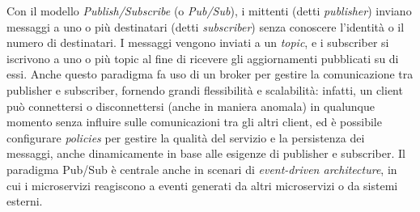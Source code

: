 Con il modello \emph{Publish/Subscribe} (o \emph{Pub/Sub}), i mittenti (detti \emph{publisher}) inviano messaggi a uno o più destinatari (detti \emph{subscriber}) senza conoscere l'identità o il numero di destinatari. I messaggi vengono inviati a un \emph{topic}, e i subscriber si iscrivono a uno o più topic al fine di ricevere gli aggiornamenti pubblicati su di essi. Anche questo paradigma fa uso di un broker per gestire la comunicazione tra publisher e subscriber, fornendo grandi flessibilità e scalabilità: infatti, un client può connettersi o disconnettersi (anche in maniera anomala) in qualunque momento senza influire sulle comunicazioni tra gli altri client, ed è possibile configurare \emph{policies} per gestire la qualità del servizio e la persistenza dei messaggi, anche dinamicamente in base alle esigenze di publisher e subscriber.
Il paradigma Pub/Sub è centrale anche in scenari di \emph{event-driven architecture}, in cui i microservizi reagiscono a eventi generati da altri microservizi o da sistemi esterni.